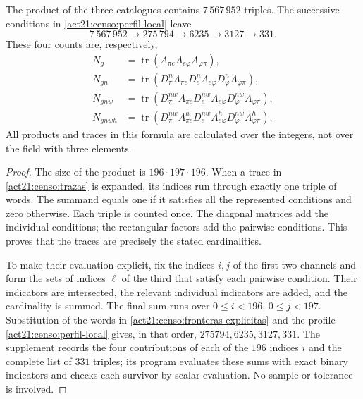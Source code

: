 \begin{theorem}
\label{act21:censo:teorema-conteo}
The product of the three catalogues contains \(7\,567\,952\) triples.
The successive conditions in \eqref{act21:censo:perfil-local} leave
\begin{equation}
 7\,567\,952\longrightarrow275\,794\longrightarrow6235
 \longrightarrow3127\longrightarrow331.
 \label{act21:censo:cadena-local}
\end{equation}
These four counts are, respectively,
\begin{align}
 N_g&=\operatorname{tr}(A_{\pi e}A_{e\varphi}A_{\varphi\pi}),
 \nonumber\\
 N_{gn}&=\operatorname{tr}(D_\pi^n A_{\pi e}
             D_e^n A_{e\varphi}D_\varphi^n A_{\varphi\pi}),
 \nonumber\\
 N_{gnw}&=\operatorname{tr}(D_\pi^{nw} A_{\pi e}
             D_e^{nw} A_{e\varphi}D_\varphi^{nw} A_{\varphi\pi}),
 \nonumber\\
 N_{gnwh}&=\operatorname{tr}(D_\pi^{nw} A^h_{\pi e}
             D_e^{nw} A^h_{e\varphi}D_\varphi^{nw} A^h_{\varphi\pi}).
 \label{act21:censo:trazas}
\end{align}
All products and traces in this formula are calculated over the integers,
not over the field with three elements.
\end{theorem}
\begin{proof}
The size of the product is \(196\cdot197\cdot196\). When a trace in
\eqref{act21:censo:trazas} is expanded, its indices run through exactly one
triple of words. The summand equals one if it satisfies all the represented
conditions and zero otherwise. Each triple is counted once.
The diagonal matrices add the individual conditions; the rectangular
factors add the pairwise conditions. This proves that the
traces are precisely the stated cardinalities.

To make their evaluation explicit, fix the indices \(i,j\) of the first
two channels and form the sets of indices \(\ell\) of the third
that satisfy each pairwise condition. Their indicators are intersected,
the relevant individual indicators are added, and the cardinality is summed.
The final sum runs over \(0\leq i<196\), \(0\leq j<197\).
Substitution of the words in \eqref{act21:censo:fronteras-explicitas} and
the profile \eqref{act21:censo:perfil-local} gives, in that order,
\(275794,6235,3127,331\). The supplement records the four contributions
of each of the \(196\) indices \(i\) and the complete list of \(331\) triples;
its program evaluates these sums with exact binary indicators and checks
each survivor by scalar evaluation. No sample or tolerance is involved.
\end{proof}

